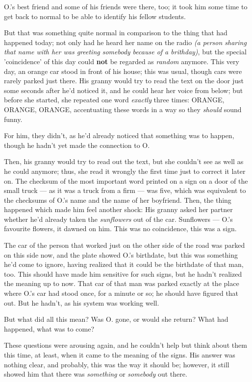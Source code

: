 O.'s best friend and some of his friends were there, too; it took him some time to get back to normal to be able to identify his fellow students.

But that was something quite normal in comparison to the thing that had happened today; not only had he heard her name on the radio \emph{(a person sharing that name with her was greeting somebody because of a brithday)}, but the special 'coincidence' of this day could \textbf{not} be regarded as \emph{random} anymore. This very day, an orange car stood in front of his house; this was usual, though cars were rarely parked just there. His granny would try to read the text on the door just some seconds after he'd noticed it, and he could hear her voice from below; but before she started, she repeated one word \emph{exactly} three times: ORANGE, ORANGE, ORANGE, accentuating these words in a way so they \emph{should} sound funny.

For him, they didn't, as he'd already noticed that something was to happen, though he hadn't yet made the connection to O.

Then, his granny would try to read out the text, but she couldn't see as well as he could anymore; thus, she read it wrongly the first time just to correct it later on. 
The checksum of the most important word printed on a sign on a door of the small truck --- as it was a truck from a firm --- was five, which was equivalent to the checksums of O.'s name and the name of her boyfriend. 
Then, the thing happened which made him feel another shock: His granny asked her partner whether he'd already taken the \emph{sunflowers} out of the car. Sunflowers --- O.'s favourite flowers, it dawned on him.
This was no coincidence, this was a sign.

The car of the person that worked just on the other side of the road was parked on this side now, and the plate showed O.'s birthdate, but this was something he'd come to ignore, having realized that it could be the birthdate of that man, too. 
This should have made him sensitive for such signs, but he hadn't realized the meaning up to now. That car of that man was parked exactly at the place where O.'s car had stood once, for a minute or so; he should have figured that out. 
But he hadn't, as his system was working well.

But what did all this mean? Was O. gone, or would she return? What had happened, what was to come?

These questions were arousing again, and he couldn't help but think about them this time, at least, when it came to the meaning of the signs. His answer was nothing clear, and probably, this was the way it should be; however, it still showed him that there was \emph{something} or \emph{somebody} out there.

